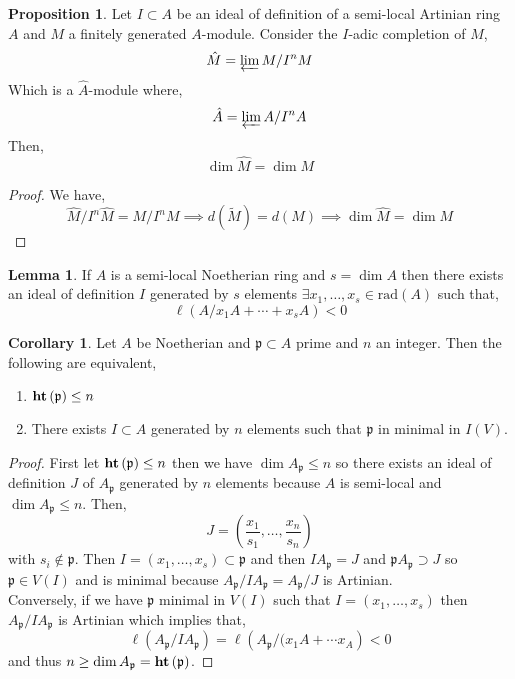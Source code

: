 \documentclass[12pt]{article}
\newcommand{\rad}[1]{\mathrm{rad}\left( #1 \right)}
\newcommand{\p}{\mathfrak{p}}
\theoremstyle{remark}
\theoremstyle{definition}
\newtheorem{lemma}[theorem]{Lemma}
\newtheorem{proposition}[theorem]{Proposition}
\newtheorem{corollary}[theorem]{Corollary}
\begin{document}
\begin{proposition}
Let $I \subset A$ be an ideal of definition of a semi-local Artinian ring $A$ and $M$ a finitely generated $A$-module. Consider the $I$-adic completion of $M$,
\[ \hat{M} = \varprojlim M / I^n M \]
Which is a $\hat{A}$-module where,
\[ \hat{A} = \varprojlim A / I^n A \]
Then,
\[ \dim{\hat{M}} = \dim{M} \]
\end{proposition}

\begin{proof}
We have,
\[ \hat{M} / I^n \hat{M} = M / I^n M \implies d(\tilde{M}) = d(M) \implies \dim{\hat{M}} = \dim{M} \]
\end{proof}

\begin{lemma}
If $A$ is a semi-local Noetherian ring and $s = \dim{A}$ then there exists an ideal of definition $I$ generated by $s$ elements $\exists x_1, \dots, x_s \in \rad{A}$ such that,
\[ \ell\left(A / x_1 A + \cdots + x_s A \right) < 0 \]
\end{lemma}

\begin{corollary}
Let $A$ be Noetherian and $\p \subset A$ prime and $n$ an integer. Then the following are equivalent,
\begin{enumerate}
\item $\height{\p} \le n$

\item There exists $I \subset A$ generated by $n$ elements such that $\p$ in minimal in $I(V)$.
\end{enumerate}
\end{corollary}

\begin{proof}
First let $\height{\p} \le n$ then we have $\dim{A_{\p}} \le n$ so there exists an ideal of definition $J$ of $A_\p$ generated by $n$ elements because $A$ is semi-local and $\dim{A_{\p}} \le n$. Then,
\[ J = \left( \frac{x_1}{s_1}, \dots, \frac{x_n}{s_n} \right) \]
with $s_i \notin \p$. Then $I = (x_1, \dots, x_s) \subset \p$ and then $I A_\p = J$ and $\p A_{\p} \supset J$ so $\p \in V(I)$ and is minimal because $A_\p / I A_\p = A_\p / J$ is Artinian. 
\bigskip\\
Conversely, if we have $\p$ minimal in $V(I)$ such that $I = (x_1, \dots, x_s)$ then $A_{\p} / I A_{\p}$ is Artinian which implies that,
\[ \ell\left( A_\p / I A_\p \right) = \ell\left( A_\p / (x_1 A + \cdots x_ A \right) < 0 \]
and thus $n \ge \dim{A_{\p}} = \height{\p}$.
\end{proof}
\end{document}
